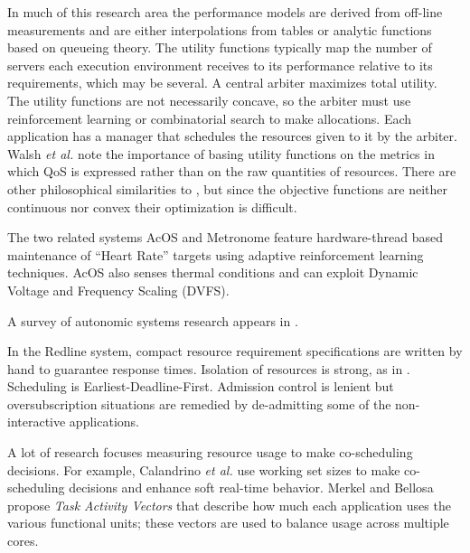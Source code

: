In much of this research area\cite{1078472,1078493,1285843,1345325}
the performance models are derived from off-line measurements and are either
interpolations from tables or analytic functions based on queueing theory.
The utility functions typically map the number of servers each execution environment receives
to its performance relative to its requirements, which may be several.
A central arbiter maximizes total utility. The utility functions are not necessarily concave,
so the arbiter must use reinforcement learning or combinatorial search to make allocations.
Each application has a manager that schedules the resources given to it by the arbiter.
%
Walsh \emph{et al.}\cite{1078411} note the importance of basing utility functions
on the metrics in which QoS is expressed rather than on the raw quantities of resources.
There are other philosophical similarities to \pacora,
but since the objective functions are neither continuous nor convex their optimization is difficult.


%
The two related systems AcOS\cite{AcOS} and Metronome\cite{Metronome} feature hardware-thread based maintenance of ``Heart Rate''
targets using adaptive reinforcement learning techniques.
AcOS also senses thermal conditions and can exploit Dynamic Voltage and Frequency Scaling (DVFS).



A survey of autonomic systems research appears in \cite{1380585}.

In the Redline system\cite{Redline}, compact resource requirement specifications are written by hand to guarantee response times.
Isolation of resources is strong, as in \pacora.  Scheduling is Earliest-Deadline-First.
Admission control is lenient but oversubscription situations are remedied by de-admitting some of the non-interactive applications.


A lot of research focuses measuring resource usage to make co-scheduling decisions.
For example, Calandrino \emph{et al.}\cite{unc} use working set sizes to make co-scheduling decisions and enhance soft real-time behavior. Merkel and Bellosa\cite{merkel-eurosys08} propose \emph{Task Activity Vectors} that describe how much each application uses the various functional units; these vectors are used to balance usage across multiple cores.

